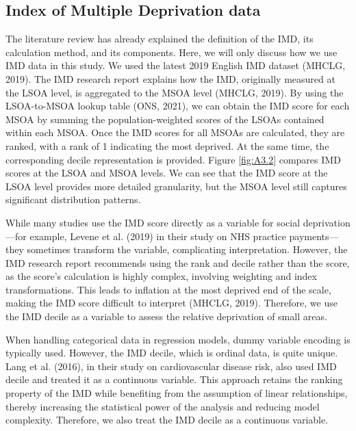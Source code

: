 \subsection{Index of Multiple Deprivation data}
\label{sec:3.2.3}
The literature review has already explained the definition of the IMD, its calculation method, and its components. Here, we will only discuss how we use IMD data in this study. We used the latest 2019 English IMD dataset (MHCLG, 2019). The IMD research report explains how the IMD, originally measured at the LSOA level, is aggregated to the MSOA level (MHCLG, 2019). By using the LSOA-to-MSOA lookup table (ONS, 2021), we can obtain the IMD score for each MSOA by summing the population-weighted scores of the LSOAs contained within each MSOA. Once the IMD scores for all MSOAs are calculated, they are ranked, with a rank of 1 indicating the most deprived. At the same time, the corresponding decile representation is provided. Figure \ref{fig:A3.2} compares IMD scores at the LSOA and MSOA levels. We can see that the IMD score at the LSOA level provides more detailed granularity, but the MSOA level still captures significant distribution patterns.

While many studies use the IMD score directly as a variable for social deprivation—for example, Levene et al. (2019) in their study on NHS practice payments—they sometimes transform the variable, complicating interpretation. However, the IMD research report recommends using the rank and decile rather than the score, as the score’s calculation is highly complex, involving weighting and index transformations. This leads to inflation at the most deprived end of the scale, making the IMD score difficult to interpret (MHCLG, 2019). Therefore, we use the IMD decile as a variable to assess the relative deprivation of small areas.

When handling categorical data in regression models, dummy variable encoding is typically used. However, the IMD decile, which is ordinal data, is quite unique. Lang et al. (2016), in their study on cardiovascular disease risk, also used IMD decile and treated it as a continuous variable. This approach retains the ranking property of the IMD while benefiting from the assumption of linear relationships, thereby increasing the statistical power of the analysis and reducing model complexity. Therefore, we also treat the IMD decile as a continuous variable.


